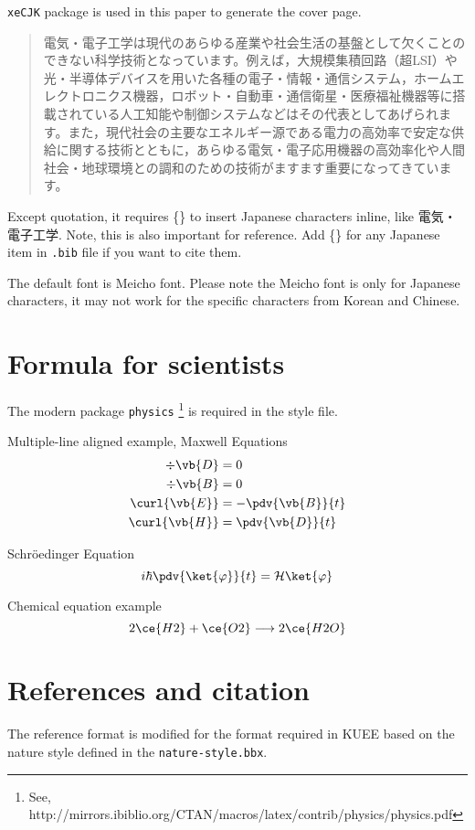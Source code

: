\documentclass{kuee_en}
\begin{document}
\verb|xeCJK| package is used in this paper to generate the cover page.
\begin{quote}
電気・電子工学は現代のあらゆる産業や社会生活の基盤として欠くことのできない科学技術となっています。例えば，大規模集積回路（超LSI）や光・半導体デバイスを用いた各種の電子・情報・通信システム，ホームエレクトロニクス機器，ロボット・自動車・通信衛星・医療福祉機器等に搭載されている人工知能や制御システムなどはその代表としてあげられます。また，現代社会の主要なエネルギー源である電力の高効率で安定な供給に関する技術とともに，あらゆる電気・電子応用機器の高効率化や人間社会・地球環境との調和のための技術がますます重要になってきています。
\end{quote}
Except quotation, it requires \{\} to insert Japanese characters inline, like
{電気・電子工学}. 
Note, this is also important for reference. Add \{\} for any Japanese item in \verb|.bib| file if you want to cite them.

The default font is Meicho font.
Please note the Meicho font is only for Japanese characters, it may not work for the specific characters from Korean and Chinese. 

\section{Formula for scientists}
The modern package \verb|physics| \footnote{See, http://mirrors.ibiblio.org/CTAN/macros/latex/contrib/physics/physics.pdf} is required in the style file.

Multiple-line aligned example, Maxwell Equations
\begin{align}
    \div{\vb{D}} &= 0 \\
    \div{\vb{B}} &= 0 \\
    \curl{\vb{E}} &= -\pdv{\vb{B}}{t} \\
    \curl{\vb{H}} &= \pdv{\vb{D}}{t}
\end{align}

Schr\"{o}edinger Equation
\begin{equation}
	i\hbar \pdv{\ket{\varphi}}{t} = \mathcal{H} \ket{\varphi}
\end{equation}

Chemical equation example
\begin{equation*}
    2\ce{H2}+\ce{O2} \longrightarrow 2\ce{H2O}
\end{equation*}

\section{References and citation}
The reference format is modified for the format required in KUEE based on the nature style defined in the \verb|nature-style.bbx|.  
\end{document}
